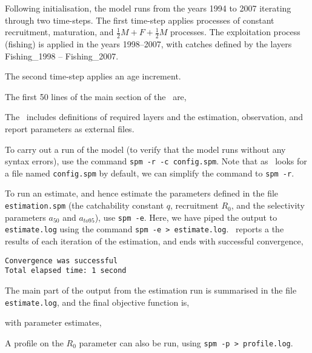 Following initialisation, the model runs from the years 1994 to 2007 iterating through two time-steps. The first time-step applies processes of constant recruitment, maturation, and  $\frac{1}{2} M + F + \frac{1}{2} M$ processes. The exploitation process (fishing) is applied in the years 1998--2007, with catches defined by the layers Fishing\_1998 -- Fishing\_2007. 

The second time-step applies an age increment.

The first 50 lines of the main section of the \config\ are,
 

The \config\ includes definitions of required layers and the estimation, observation, and report parameters as external files.

To carry out a run of the model (to verify that the model runs without any syntax errors), use the command \texttt{spm -r -c config.spm}. Note that as \SPM\ looks for a file named \texttt{config.spm} by default, we can simplify the command to \texttt{spm -r}. 

To run an estimate, and hence estimate the parameters defined in the file \texttt{estimation.spm} (the catchability constant $q$, recruitment $R_0$, and the selectivity parameters $a_{50}$ and $a_{to95}$), use  \texttt{spm -e}. Here, we have piped the output to \texttt{estimate.log} using the command \texttt{spm -e > estimate.log}.  \SPM\ reports a the results of each iteration of the estimation, and ends with successful convergence,
\begin{verbatim}
Convergence was successful
Total elapsed time: 1 second
\end{verbatim}

The main part of the output from the estimation run is summarised in the file \texttt{estimate.log}, and the final objective function is,
 
with parameter estimates,
 

A profile on the $R_0$ parameter can also be run, using \texttt{spm -p > profile.log}.
